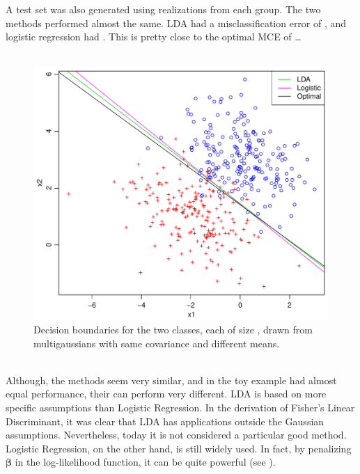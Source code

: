 A test set was also generated using  realizations from each group. The two methods performed almost the same. LDA had a misclassification error of , and logistic regression had . This is pretty close to the optimal MCE of \ldots {} \\
\\
%
\begin{figure}[h!]
\begin{center}
    \includegraphics[scale=0.5]{./figures/ldaVsLogistic.pdf}
\end{center}
\caption{Decision boundaries for the two classes, each of size , drawn from multigaussians with same covariance and different means.}
\label{fig:ldaVsLogistic}
\end{figure}
\\
Although, the methods seem very similar, and in the toy example had almost equal performance, their can perform very different. LDA is based on more specific assumptions than Logistic Regression. In the derivation of Fisher's Linear Discriminant, it was clear that LDA has applications outside the Gaussian assumptions. Nevertheless, today it is not considered a particular good method. Logistic Regression, on the other hand, is still widely used.  In fact, by penalizing $\bm \beta$ in the log-likelihood function, it can be quite powerful (see \cite{modstat}).
